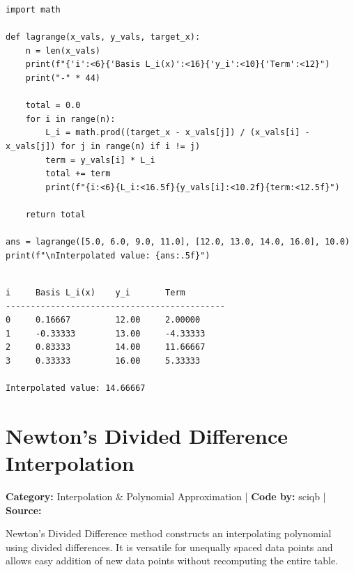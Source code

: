 \documentclass[10pt,a4paper]{report}
\begin{document}
\begin{tcolorbox}[colback=codebg,colframe=secondary,title=\textbf{Python Implementation (Step-by-Step Functions)},boxrule=1pt,arc=2mm]
\begin{lstlisting}[style=python_detailed]
import math

def lagrange(x_vals, y_vals, target_x):
    n = len(x_vals)
    print(f"{'i':<6}{'Basis L_i(x)':<16}{'y_i':<10}{'Term':<12}")
    print("-" * 44)

    total = 0.0
    for i in range(n):
        L_i = math.prod((target_x - x_vals[j]) / (x_vals[i] - x_vals[j]) for j in range(n) if i != j)
        term = y_vals[i] * L_i
        total += term
        print(f"{i:<6}{L_i:<16.5f}{y_vals[i]:<10.2f}{term:<12.5f}")

    return total

ans = lagrange([5.0, 6.0, 9.0, 11.0], [12.0, 13.0, 14.0, 16.0], 10.0)
print(f"\nInterpolated value: {ans:.5f}")


\end{lstlisting}
\end{tcolorbox}

\begin{tcolorbox}[colback=termbg,colframe=primary,title=\textbf{Program Execution Output \& Convergence Table},boxrule=1pt,arc=2mm]
\begin{lstlisting}[style=terminal_output]
i     Basis L_i(x)    y_i       Term        
--------------------------------------------
0     0.16667         12.00     2.00000     
1     -0.33333        13.00     -4.33333    
2     0.83333         14.00     11.66667    
3     0.33333         16.00     5.33333     

Interpolated value: 14.66667
\end{lstlisting}
\end{tcolorbox}

\newpage


\section{Newton's Divided Difference Interpolation}
\textbf{Category:} \textcolor{secondary}{Interpolation \& Polynomial Approximation} \quad | \quad \textbf{Code by:} \textcolor{secondary}{sciqb} \quad | \quad \textbf{Source:} \texttt{}

Newton's Divided Difference method constructs an interpolating polynomial using divided differences. It is versatile for unequally spaced data points and allows easy addition of new data points without recomputing the entire table.
\end{document}
